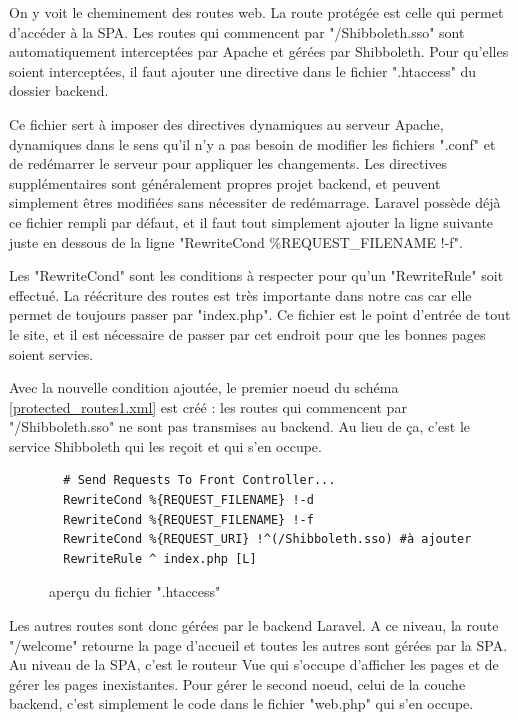\documentclass[
    iai, %
    eai, %
]{heig-tb}
\begin{document}
On y voit le cheminement des routes web. La route protégée est celle qui permet d'accéder à la SPA. Les routes qui commencent par "/Shibboleth.sso" sont automatiquement interceptées par Apache et gérées par Shibboleth. Pour qu'elles soient interceptées, il faut ajouter une directive dans le fichier ".htaccess" du dossier backend.

Ce fichier sert à imposer des directives dynamiques au serveur Apache, dynamiques dans le sens qu'il n'y a pas besoin de modifier les fichiers ".conf" et de redémarrer le serveur pour appliquer les changements. Les directives supplémentaires sont généralement propres projet backend, et peuvent simplement êtres modifiées sans nécessiter de redémarrage.
Laravel possède déjà ce fichier rempli par défaut, et il faut tout simplement ajouter la ligne suivante juste en dessous de la ligne "RewriteCond \%{REQUEST\_FILENAME} !-f".

Les "RewriteCond" sont les conditions à respecter pour qu'un "RewriteRule" soit effectué. La réécriture des routes est très importante dans notre cas car elle permet de toujours passer par "index.php". Ce fichier est le point d'entrée de tout le site, et il est nécessaire de passer par cet endroit pour que les bonnes pages soient servies.

\newpage
Avec la nouvelle condition ajoutée, le premier noeud du schéma \ref{protected_routes1.xml} est créé : les routes qui commencent par "/Shibboleth.sso" ne sont pas transmises au backend. Au lieu de ça, c'est le service Shibboleth qui les reçoit et qui s'en occupe.

\begin{figure}[h]
  \begin{verbatim}
  # Send Requests To Front Controller...
  RewriteCond %{REQUEST_FILENAME} !-d
  RewriteCond %{REQUEST_FILENAME} !-f
  RewriteCond %{REQUEST_URI} !^(/Shibboleth.sso) #à ajouter
  RewriteRule ^ index.php [L]
  \end{verbatim}
  \caption{aperçu du fichier ".htaccess"}
\end{figure}

Les autres routes sont donc gérées par le backend Laravel. A ce niveau, la route "/welcome" retourne la page d'accueil et toutes les autres sont gérées par la SPA. Au niveau de la SPA, c'est le routeur Vue qui s'occupe d'afficher les pages et de gérer les pages inexistantes.
Pour gérer le second noeud, celui de la couche backend, c'est simplement le code dans le fichier "web.php" qui s'en occupe.
\end{document}
